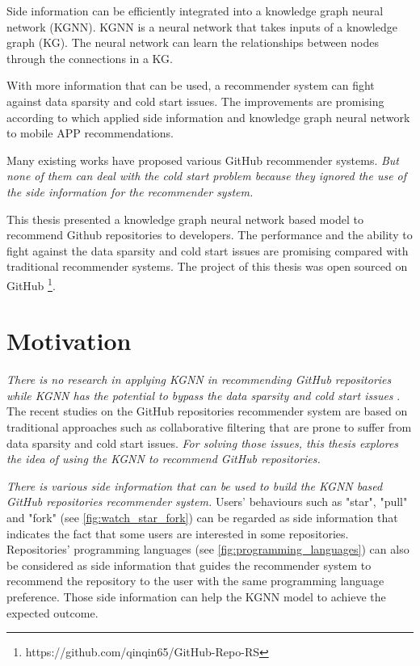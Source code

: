 \documentclass[11pt,twoside]{report}
\begin{document}
Side information can be efficiently integrated into a knowledge graph neural network (KGNN). KGNN is a neural network that takes inputs of a knowledge graph (KG). The neural network can learn the relationships between nodes through the connections in a KG.

With more information that can be used, a recommender system can fight against data sparsity and cold start issues. The improvements are promising according to \cite{zhang_knowledge_2020} which applied side information and knowledge graph neural network to mobile APP recommendations.

Many existing works have proposed various GitHub recommender systems. \textit{But none of them can deal with the cold start problem because they ignored the use of the side information for the recommender system.}

This thesis presented a knowledge graph neural network based model to recommend Github repositories to developers. The performance and the ability to fight against the data sparsity and cold start issues are promising compared with traditional recommender systems. The project of this thesis was open sourced on GitHub \footnote{https://github.com/qinqin65/GitHub-Repo-RS}.

\section{Motivation}
\textit{There is no research in applying KGNN in recommending GitHub repositories while KGNN has the potential to bypass the data sparsity and cold start issues} \cite{mansur_review_nodate}. The recent studies on the GitHub repositories recommender system are based on traditional approaches such as collaborative filtering that are prone to suffer from data sparsity and cold start issues. \textit{For solving those issues, this thesis explores the idea of using the KGNN to recommend GitHub repositories.}

\textit{There is various side information that can be used to build the KGNN based GitHub repositories recommender system.} Users’ behaviours such as "star", "pull" and "fork" (see \ref{fig:watch_star_fork}) can be regarded as side information that indicates the fact that some users are interested in some repositories. Repositories' programming languages (see \ref{fig:programming_languages}) can also be considered as side information that guides the recommender system to recommend the repository to the user with the same programming language preference. Those side information can help the KGNN model to achieve the expected outcome.
\end{document}
